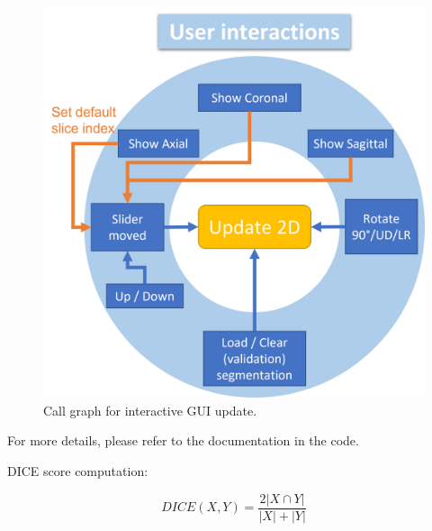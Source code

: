 \begin{figure}[h]
	\centering
	\includegraphics[height=.5\linewidth]{figures/call_graph.png}
	\caption{Call graph for interactive GUI update.}
\end{figure}

For more details, please refer to the documentation in the code.

DICE score computation:

\begin{equation}
	DICE(X, Y) =\frac{2|X \cap Y|}{|X|+|Y|}
\end{equation}